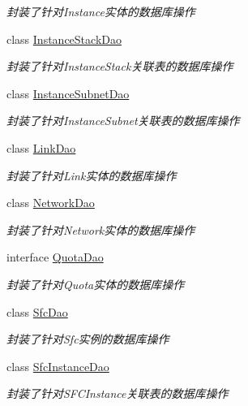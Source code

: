\begin{DoxyCompactItemize}
\begin{DoxyCompactList}\small\item\em 封装了针对\+Instance实体的数据库操作 \end{DoxyCompactList}\item 
class \mbox{\hyperlink{interfacecom_1_1example_1_1demo_1_1dao_1_1_instance_stack_dao}{Instance\+Stack\+Dao}}
\begin{DoxyCompactList}\small\item\em 封装了针对\+Instance\+Stack关联表的数据库操作 \end{DoxyCompactList}\item 
class \mbox{\hyperlink{interfacecom_1_1example_1_1demo_1_1dao_1_1_instance_subnet_dao}{Instance\+Subnet\+Dao}}
\begin{DoxyCompactList}\small\item\em 封装了针对\+Instance\+Subnet关联表的数据库操作 \end{DoxyCompactList}\item 
class \mbox{\hyperlink{interfacecom_1_1example_1_1demo_1_1dao_1_1_link_dao}{Link\+Dao}}
\begin{DoxyCompactList}\small\item\em 封装了针对\+Link实体的数据库操作 \end{DoxyCompactList}\item 
class \mbox{\hyperlink{interfacecom_1_1example_1_1demo_1_1dao_1_1_network_dao}{Network\+Dao}}
\begin{DoxyCompactList}\small\item\em 封装了针对\+Network实体的数据库操作 \end{DoxyCompactList}\item 
interface \mbox{\hyperlink{interfacecom_1_1example_1_1demo_1_1dao_1_1_quota_dao}{Quota\+Dao}}
\begin{DoxyCompactList}\small\item\em 封装了针对\+Quota实体的数据库操作 \end{DoxyCompactList}\item 
class \mbox{\hyperlink{interfacecom_1_1example_1_1demo_1_1dao_1_1_sfc_dao}{Sfc\+Dao}}
\begin{DoxyCompactList}\small\item\em 封装了针对\+Sfc实例的数据库操作 \end{DoxyCompactList}\item 
class \mbox{\hyperlink{interfacecom_1_1example_1_1demo_1_1dao_1_1_sfc_instance_dao}{Sfc\+Instance\+Dao}}
\begin{DoxyCompactList}\small\item\em 封装了针对\+S\+F\+C\+Instance关联表的数据库操作 \end{DoxyCompactList}\item 

\end{DoxyCompactItemize}
